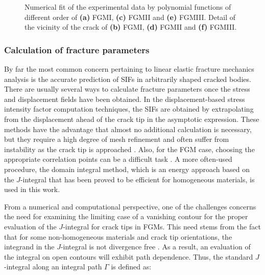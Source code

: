 \begin{figure*}[htbp]
    \hfill
    
    \hfill
    
    \hfill
    \caption{Numerical fit of the experimental data by polynomial functions of different order of \textbf{(a)} FGMI, \textbf{(c)} FGMII and \textbf{(e)} FGMIII. Detail of the vicinity of the crack of \textbf{(b)} FGMI, \textbf{(d)} FGMII and \textbf{(f)} FGMIII.}
    \label{fig:Fig4}
\end{figure*}

\subsubsection{Calculation of fracture parameters}

By far the most common concern pertaining to linear elastic fracture mechanics analysis is the accurate prediction of SIFs in arbitrarily shaped cracked bodies. There are usually several ways to calculate fracture parameters once the stress and displacement fields have been obtained. In the displacement-based stress intensity factor computation techniques, the SIFs are obtained by extrapolating from the displacement ahead of the crack tip in the asymptotic expression. These methods have the advantage that almost no additional calculation is necessary, but they require a high degree of mesh refinement and often suffer from instability as the crack tip is approached \citep{Anderson2005}. Also, for the FGM case, choosing the appropriate correlation points can be a difficult task \citep{Tilbrook2005}. A more often-used procedure, the domain integral method, which is an energy approach based on the $J$-integral \citep{Rice1968} that has been proved to be efficient for homogeneous materials, is used in this work.

From a numerical and computational perspective, one of the challenges concerns the need for examining the limiting case of a vanishing contour for the proper evaluation of the $J$-integral for crack tips in FGMs. This need stems from the fact that for some non-homogeneous materials and crack tip orientations, the integrand in the $J$-integral is not divergence free \citep{Chen2000}. As a result, an evaluation of the integral on open contours will exhibit path dependence. Thus, the standard $J$-integral along an integral path $\Gamma$ is defined as:

